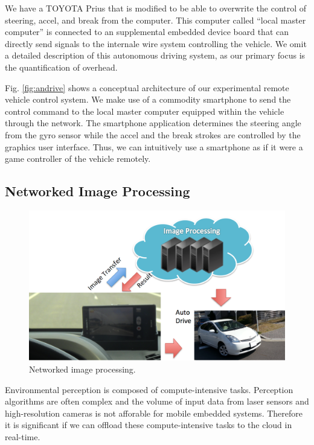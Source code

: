 We have a TOYOTA Prius that is modified to be able to overwrite the
control of steering, accel, and break from the computer.
This computer called ``local master computer'' is connected to an
supplemental embedded device board that can directly send signals to the
internale wire system controlling the vehicle.
We omit a detailed description of this autonomous driving system, as our
primary focus is the quantification of overhead.

Fig. \ref{fig:andrive} shows a conceptual architecture of our
experimental remote vehicle control system.
We make use of a commodity smartphone to send the control command to the
local master computer equipped within the vehicle through the network.
The smartphone application determines the steering angle from the gyro
sensor while the accel and the break strokes are controlled by the
graphics user interface.
Thus, we can intuitively use a smartphone as if it were a game
controller of the vehicle remotely.

\subsection{Networked Image Processing}

\begin{figure}[!t]
 \centering
 \includegraphics[width=\hsize]{fig/TIPIC.pdf}
 \caption{Networked image processing.}
 \label{fig:tipic}
\end{figure}

Environmental perception is composed of compute-intensive tasks.
Perception algorithms are often complex and the volume of input data
from laser sensors and high-resolution cameras is not afforable for
mobile embedded systems.
Therefore it is significant if we can offload these compute-intensive
tasks to the cloud in real-time.

